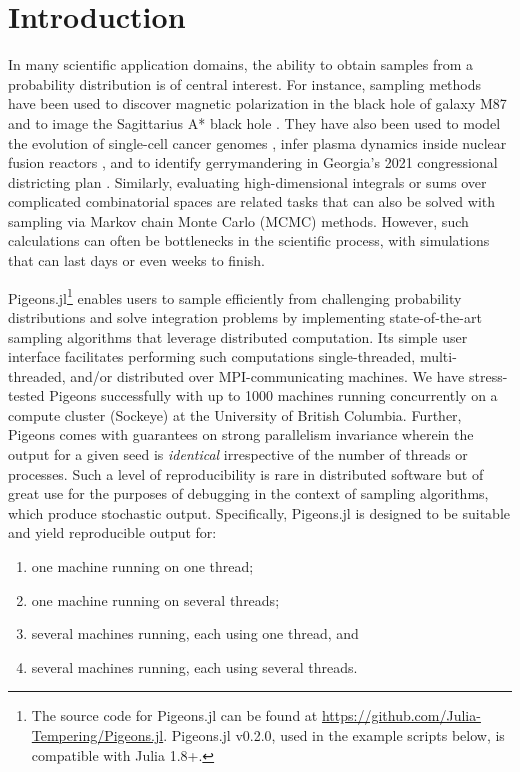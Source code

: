 \section{Introduction}
In many scientific application domains, the ability to obtain samples from a 
probability distribution is of central interest. 
For instance, sampling methods have been used to discover magnetic polarization 
in the black hole of galaxy M87 \cite{akiyama2021seven}
and to image the Sagittarius A* black hole \cite{akiyama2022first}.
They have also been used to 
model the evolution of single-cell cancer genomes \cite{salehi2021clonal}, 
infer plasma dynamics inside nuclear fusion reactors \cite{gota2021overview}, 
and to identify gerrymandering in Georgia's 2021 congressional districting plan 
\cite{zhao2022mathematically}.
Similarly, evaluating high-dimensional integrals or sums over complicated 
combinatorial spaces are related tasks that can also be solved with sampling 
via Markov chain Monte Carlo (MCMC) methods. 
However, such calculations can often be bottlenecks in the scientific process, with 
simulations that can last days or even weeks to finish. 

\medskip
Pigeons.jl\footnote{The source code for Pigeons.jl can be found at 
\url{https://github.com/Julia-Tempering/Pigeons.jl}. 
Pigeons.jl v0.2.0, used in the example scripts below, is compatible with Julia 1.8+.}
enables users to sample efficiently from challenging probability distributions 
and solve integration problems by 
implementing state-of-the-art sampling algorithms \cite{syed2021nrpt,surjanovic2022vpt} 
that leverage distributed computation. Its simple user interface facilitates performing such computations 
single-threaded, multi-threaded, and/or distributed over MPI-communicating machines. 
We have stress-tested Pigeons successfully with up to 1000 machines running 
concurrently on a compute cluster (Sockeye) at the University of British Columbia.
Further, Pigeons comes with guarantees on strong parallelism invariance wherein 
the output for a given seed is \emph{identical} irrespective 
of the number of threads or processes. 
Such a level of reproducibility is rare in distributed software but of 
great use for the purposes of debugging in the context of sampling algorithms, 
which produce stochastic output.
Specifically, Pigeons.jl is designed to be suitable and yield reproducible output for:
\begin{enumerate}
    \item one machine running on one thread;
    \item one machine running on several threads;
    \item several machines running, each using one thread, and
    \item several machines running, each using several threads.
\end{enumerate}

